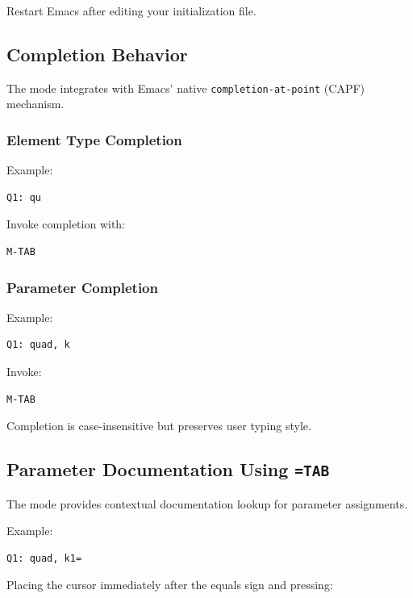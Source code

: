 Restart Emacs after editing your initialization file.

\subsection{Completion Behavior}

The mode integrates with Emacs’ native \texttt{completion-at-point} (CAPF) mechanism.

\subsubsection{Element Type Completion}

Example:

\begin{lstlisting}
Q1: qu
\end{lstlisting}

Invoke completion with:

\begin{lstlisting}
M-TAB
\end{lstlisting}

\subsubsection{Parameter Completion}

Example:

\begin{lstlisting}
Q1: quad, k
\end{lstlisting}

Invoke:

\begin{lstlisting}
M-TAB
\end{lstlisting}

Completion is case-insensitive but preserves user typing style.

\subsection{Parameter Documentation Using \texttt{=TAB}}

The mode provides contextual documentation lookup for parameter assignments.

Example:

\begin{lstlisting}
Q1: quad, k1=
\end{lstlisting}

Placing the cursor immediately after the equals sign and pressing:

